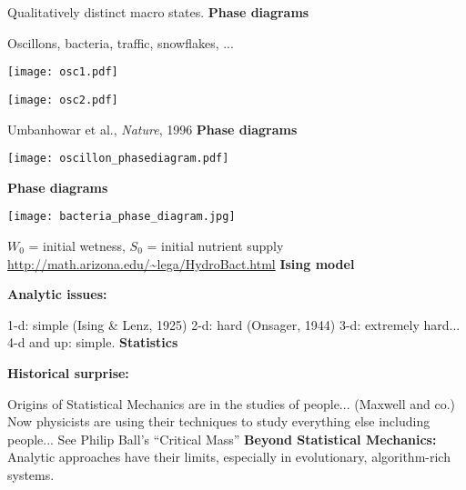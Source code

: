   \medskip

  Qualitatively distinct macro states.
  \textbf{Phase diagrams}

  Oscillons, bacteria, traffic, snowflakes, ...

  \medskip
  
  
\begin{marginfigure}[]
\texttt{[image: osc1.pdf]}
\end{marginfigure}

  
\begin{marginfigure}[]
\texttt{[image: osc2.pdf]}
\end{marginfigure}


  \medskip

  Umbanhowar et al., \textit{Nature}, 1996\cite{umbanhowar1996a}
  \textbf{Phase diagrams}

  \begin{center}
    
\begin{marginfigure}[]
\texttt{[image: oscillon\_phasediagram.pdf]}
\end{marginfigure}

  \end{center}
  \textbf{Phase diagrams}

  \begin{center}
    
\begin{marginfigure}[]
\texttt{[image: bacteria\_phase\_diagram.jpg]}
\end{marginfigure}

  \end{center}

  {\tiny $W_0$ = initial wetness, $S_0$ = initial nutrient supply\\
    \url{http://math.arizona.edu/~lega/HydroBact.html}}
  \textbf{Ising model}

  \textbf{Analytic issues:}
    
     1-d: simple (Ising \& Lenz, 1925)
     2-d: hard (Onsager, 1944)
     3-d: extremely hard...
     4-d and up: simple.
  \textbf{Statistics}

  \textbf{Historical surprise:}
  
   Origins of Statistical Mechanics are in the studies of people...
    (Maxwell and co.)
   Now physicists are using their techniques to study everything else
    including people...
   See Philip Ball's ``Critical Mass''\cite{ball2004a}
  \textbf{Beyond Statistical Mechanics:}
      Analytic approaches have their limits,
      especially in evolutionary, algorithm-rich systems.
    
